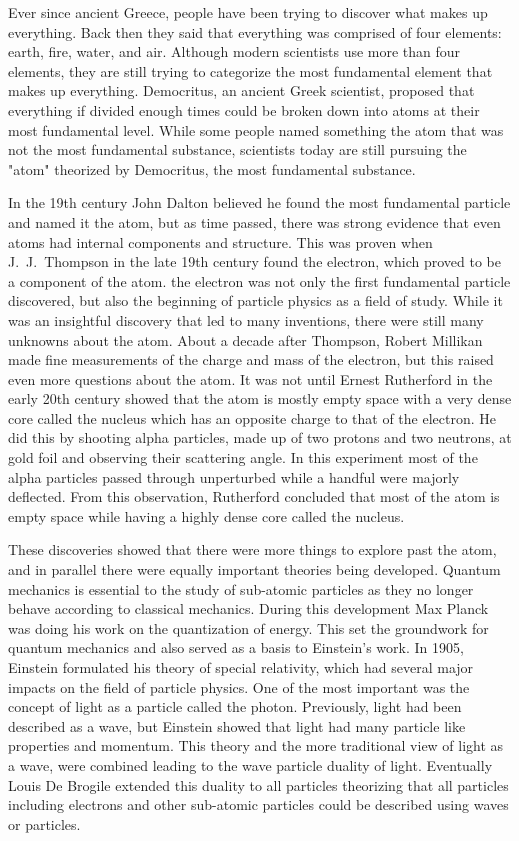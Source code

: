 Ever since ancient Greece, people have been trying to discover what makes up everything. Back then they said that everything was comprised of four elements: earth, fire, water, and air. Although modern scientists use more than four elements, they are still trying to categorize the most fundamental element that makes up everything. Democritus, an ancient Greek scientist, proposed that everything if divided enough times could be broken down into atoms at their most fundamental level. While some people named something the atom that was not the most fundamental substance, scientists today are still pursuing the "atom" theorized by Democritus, the most fundamental substance. 

In the 19th century John Dalton believed he found the most fundamental particle and named it the atom, but as time passed, there was strong evidence that even atoms had internal components and structure. This was proven when J.~J.~Thompson in the late 19th century found the electron, which proved to be a component of the atom. the electron was not only the first fundamental particle discovered, but also the beginning of particle physics as a field of study. While it was an insightful discovery that led to many inventions, there were still many unknowns about the atom. About a decade after Thompson, Robert Millikan made fine measurements of the charge and mass of the electron, but this raised even more questions about the atom. It was not until Ernest Rutherford in the early 20th century showed that the atom is mostly empty space with a very dense core called the nucleus which has an opposite charge to that of the electron. He did this by shooting alpha particles, made up of two protons and two neutrons, at gold foil and observing their scattering angle. In this experiment most of the alpha particles passed through unperturbed while a handful were majorly deflected. From this observation, Rutherford concluded that most of the atom is empty space while having a highly dense core called the nucleus. 

These discoveries showed that there were more things to explore past the atom, and in parallel there were equally important theories being developed. Quantum mechanics is essential to the study of sub-atomic particles as they no longer behave according to classical mechanics. During this development Max Planck was doing his work on the quantization of energy. This set the groundwork for quantum mechanics and also served as a basis to Einstein's work. In 1905, Einstein formulated his theory of special relativity, which had several major impacts on the field of particle physics. One of the most important was the concept of light as a particle called the photon. Previously, light had been described as a wave, but Einstein showed that light had many particle like properties and momentum. This theory and the more traditional view of light as a wave, were combined leading to the wave particle duality of light. Eventually Louis De Brogile extended this duality to all particles theorizing that all particles including electrons and other sub-atomic particles could be described using waves or particles.

